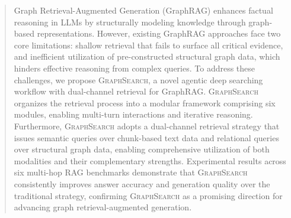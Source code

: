 \begin{abstract}
Graph Retrieval-Augmented Generation (GraphRAG) enhances factual reasoning in LLMs by structurally modeling knowledge through graph-based representations. However, existing GraphRAG approaches face two core limitations: shallow retrieval that fails to surface all critical evidence, and inefficient utilization of pre-constructed structural graph data, which hinders effective reasoning from complex queries. To address these challenges, we propose \textsc{GraphSearch}, a novel agentic deep searching workflow with dual-channel retrieval for GraphRAG. \textsc{GraphSearch} organizes the retrieval process into a modular framework comprising six modules, enabling multi-turn interactions and iterative reasoning. Furthermore, \textsc{GraphSearch} adopts a dual-channel retrieval strategy that issues semantic queries over chunk-based text data and relational queries over structural graph data, enabling comprehensive utilization of both modalities and their complementary strengths. Experimental results across six multi-hop RAG benchmarks demonstrate that \textsc{GraphSearch} consistently improves answer accuracy and generation quality over the traditional strategy, confirming \textsc{GraphSearch} as a promising direction for advancing graph retrieval-augmented generation.
\end{abstract}